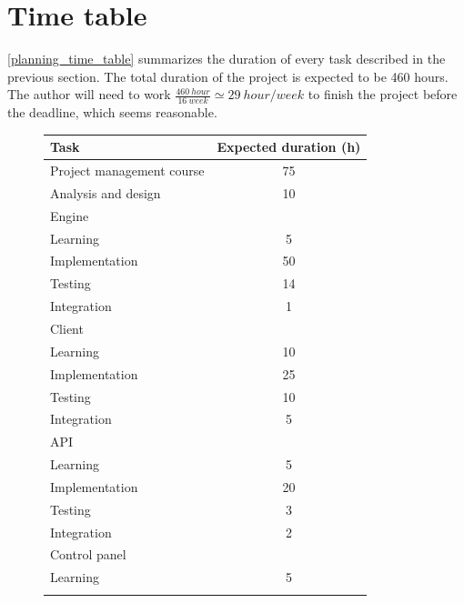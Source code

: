 \documentclass[a4paper,11pt,titlepage,abstract,numbers=noenddot,automark,mnsy,intlimits,rgb,dvipsnames]{report}
\begin{document}
\section{Time table}
\autoref{planning_time_table} summarizes the duration of every task described in the previous section.
The total duration of the project is expected to be 460 hours. The author will need to work
$\frac{460 \: hour}{16 \: week} \simeq 29 \: hour/week$ to finish the project before the deadline, which seems reasonable.
\begin{figure}[H]
\begin{center}
\begin{tabular}{l S}
\textbf{Task} & \textbf{Expected duration (h)}\\
\hline
Project management course & 75\\
\hline
Analysis and design & 10\\
\hline
Engine & \\
\hspace{1em}
Learning & 5\\
\hspace{1em}
Implementation & 50\\
\hspace{1em}
Testing & 14\\
\hspace{1em}
Integration & 1\\
\hline
Client & \\
\hspace{1em}
Learning & 10\\
\hspace{1em}
Implementation & 25\\
\hspace{1em}
Testing & 10\\
\hspace{1em}
Integration & 5\\
\hline
API & \\
\hspace{1em}
Learning & 5\\
\hspace{1em}
Implementation & 20\\
\hspace{1em}
Testing & 3\\
\hspace{1em}
Integration & 2\\
\hline
Control panel & \\
\hspace{1em}
Learning & 5\\
\hspace{1em}

\end{tabular}
\end{center}
\end{figure}
\end{document}
